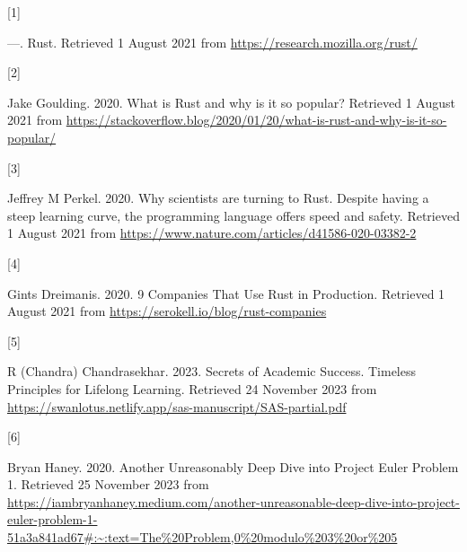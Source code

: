 \documentclass[
  a4paper,
]{article}
\newlength{\cslhangindent}
\newlength{\csllabelwidth}
\newlength{\cslentryspacingunit} %
\newenvironment{CSLReferences}[2] %
 {%
  \setlength{\parindent}{0pt}
  \ifodd #1
  \let\oldpar\par
  \def\par{\hangindent=\cslhangindent\oldpar}
  \fi
  \setlength{\parskip}{#2\cslentryspacingunit}
 }%
 {}
\newcommand{\CSLLeftMargin}[1]{\parbox[t]{\csllabelwidth}{#1}}
\newcommand{\CSLRightInline}[1]{\parbox[t]{\linewidth - \csllabelwidth}{#1}\break}
\begin{document}
\hypertarget{refs}{}
\begin{CSLReferences}{0}{0}
\leavevmode{}%
\CSLLeftMargin{{[}1{]} }%
\CSLRightInline{---. {Rust}. Retrieved 1 August 2021 from
\url{https://research.mozilla.org/rust/}}

\leavevmode{}%
\CSLLeftMargin{{[}2{]} }%
\CSLRightInline{Jake Goulding. 2020. {What is Rust and why is it so
popular?} Retrieved 1 August 2021 from
\url{https://stackoverflow.blog/2020/01/20/what-is-rust-and-why-is-it-so-popular/}}

\leavevmode{}%
\CSLLeftMargin{{[}3{]} }%
\CSLRightInline{Jeffrey M Perkel. 2020. {Why scientists are turning to
Rust}. Despite having a steep learning curve, the programming language
offers speed and safety. Retrieved 1 August 2021 from
\url{https://www.nature.com/articles/d41586-020-03382-2}}

\leavevmode{}%
\CSLLeftMargin{{[}4{]} }%
\CSLRightInline{Gints Dreimanis. 2020. {9 Companies That Use Rust in
Production}. Retrieved 1 August 2021 from
\url{https://serokell.io/blog/rust-companies}}

\leavevmode{}%
\CSLLeftMargin{{[}5{]} }%
\CSLRightInline{R (Chandra) Chandrasekhar. 2023. {Secrets of Academic
Success}. {Timeless Principles for Lifelong Learning}. Retrieved 24
November 2023 from
\url{https://swanlotus.netlify.app/sas-manuscript/SAS-partial.pdf}}

\leavevmode{}%
\CSLLeftMargin{{[}6{]} }%
\CSLRightInline{Bryan Haney. 2020. {Another Unreasonably Deep Dive into
Project Euler Problem 1}. Retrieved 25 November 2023 from
\url{https://iambryanhaney.medium.com/another-unreasonable-deep-dive-into-project-euler-problem-1-51a3a841ad67\#:~:text=The\%20Problem,0\%20modulo\%203\%20or\%205}}

\end{CSLReferences}
\end{document}
